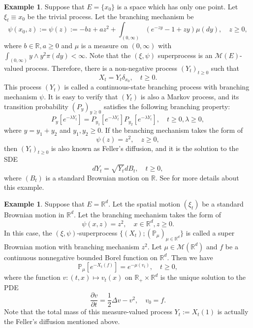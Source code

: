\documentclass[UTF8]{pkuthss}
\theoremstyle{plain}
\theoremstyle{definition}
\newtheorem{exa}[thm]{Example}
\numberwithin{equation}{section}
\begin{document}
\begin{exa}
	Suppose that $E=\{x_0\}$ is a space which has only one point. Let $\xi_t \equiv x_0$ be the trivial process. Let the branching mechanism be
\begin{equation}
\label{eq: psi for CSBP}
	\psi(x_0,z):=\psi(z) := -b z + a z^2 + \int_{(0,\infty)}(e^{-zy}-1+zy)\mu(dy) ,\quad z\geq 0,
\end{equation}
	where $b\in \mathbb R, a \geq 0$ and $\mu$ is a measure on $(0,\infty)$ with $\int_{(0,\infty)} y \wedge y^2 \pi(dy) < \infty$. 
	Note that the $(\xi,\psi)$ superprocess is an $\mathcal M(E)$-valued process. Therefore, there is a non-negative process $(Y_t)_{t\geq 0}$ such that
\[
	X_t = Y_t \delta_{x_0},\quad t\geq 0.
\]
	This process $(Y_t)$ is called a continuous-state branching process with branching mechanism $\psi$.
	It is easy to verify that $(Y_t)$ is also a Markov process, and its transition probability $(P_y)_{y\geq 0}$ satisfies the following branching property:
\[
	P_y[e^{-\lambda Y_t}] = P_{y_1}[e^{-\lambda Y_t}] P_{y_2}[e^{-\lambda Y_t}],\quad t\geq 0,\lambda \geq 0,
\]  
	where $y = y_1+y_2$ and $y_1,y_2\geq 0$. 
	If the branching mechanism takes the form of 
\begin{equation}
\label{eq: branching mechanism for CSBP}
	\psi(z) = z^2, \quad z\geq 0,
\end{equation}
	then $(Y_t)_{t\geq 0}$ is also known as Feller's diffusion, and it is the solution to the SDE
\[
	dY_t = \sqrt{Y_t} dB_t, \quad t\geq 0,
\]
	where $(B_t)$ is a standard Brownian motion on $\mathbb R$.
	See \cite{Li2011Measure-valued} for more details about this example.
\end{exa}

\begin{exa}
	Suppose that $E = \mathbb R^d$. Let the spatial motion $(\xi_t)$ be a standard Brownian motion in $\mathbb R^d$. Let the branching mechanism takes the form of
\[
	\psi(x,z) = z^{2}, \quad x\in \mathbb R^d, z\geq 0.
\]
	In this case, the $(\xi,\psi)$-superprocess $\{(X_t);(\mathbb P_\mu)_{\mu \in \mathbb R^d}\}$ is called a super Brownian motion with branching mechanism $z^2$. Let $\mu \in \mathcal M(\mathbb R^d)$ and $f$ be a continuous nonnegative bounded Borel function on $\mathbb R^d$.
	Then we have
\[
	\mathbb P_\mu[e^{- X_t(f)}] = e^{-\mu(v_t)},\quad t\geq 0,
\]
	where the function $v:(t,x)\mapsto v_t(x)$ on $\mathbb R_+\times \mathbb R^d$ is the unique solution to the PDE
\[
	\frac{\partial v}{\partial t} = \frac{1}{2} \Delta v - v^{2},
	\quad v_0 = f. 
\]
	Note that the total mass of this measure-valued process $Y_t:=X_t(1)$ is actually the Feller's diffusion mentioned above.
\end{exa}
	
\end{document}
